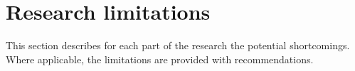 \begin{itemize}
\begin{itemize}
%
%
\end{itemize}
\end{itemize}

\section{Research limitations}
This section describes for each part of the research the potential shortcomings. Where applicable, the limitations are provided with recommendations.  

